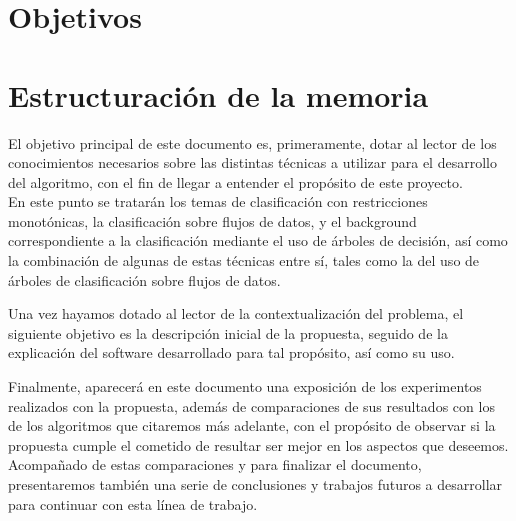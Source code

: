 \section{Objetivos}



\section{Estructuración de la memoria}


























El objetivo principal de este documento es, primeramente, dotar al lector de los conocimientos necesarios sobre las distintas técnicas a utilizar para el desarrollo del algoritmo, con el fin de llegar a entender el propósito de este proyecto.\\
En este punto se tratarán los temas de clasificación con restricciones monotónicas, la clasificación sobre flujos de datos, y el background correspondiente a la clasificación mediante el uso de árboles de decisión, así como la combinación de algunas de estas técnicas entre sí, tales como la del uso de árboles de clasificación sobre flujos de datos.

Una vez hayamos dotado al lector de la contextualización del problema, el siguiente objetivo es la descripción inicial de la propuesta, seguido de la explicación del software desarrollado para tal propósito, así como su uso.

Finalmente, aparecerá en este documento una exposición de los experimentos realizados con la propuesta, además de comparaciones de sus resultados con los de los algoritmos que citaremos más adelante, con el propósito de observar si la propuesta cumple el cometido de resultar ser mejor en los aspectos que deseemos.\\
Acompañado de estas comparaciones y para finalizar el documento, presentaremos también una serie de conclusiones y trabajos futuros a desarrollar para continuar con esta línea de trabajo.

\newpage

